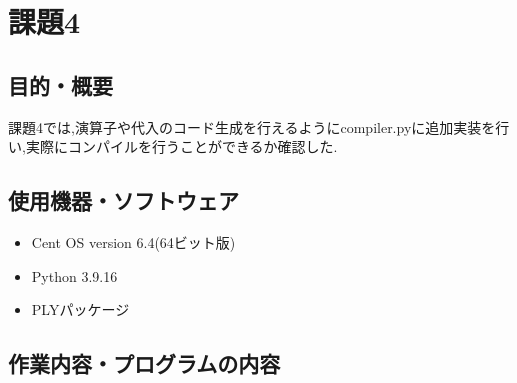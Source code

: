 \documentclass[main]{subfiles}
\begin{document}
\chapter{課題4}
\section{目的・概要}
課題4では,演算子や代入のコード生成を行えるようにcompiler.pyに追加実装を行い,実際にコンパイルを行うことができるか確認した.

\section{使用機器・ソフトウェア}
\begin{itemize}
    \item Cent OS version 6.4(64ビット版)
    \item Python 3.9.16
    \item PLYパッケージ
\end{itemize}

\section{作業内容・プログラムの内容}
\end{document}
